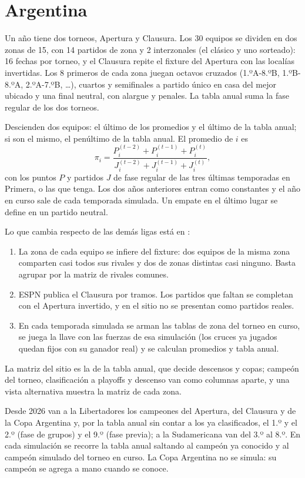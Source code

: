 \section{Argentina}
\label{sec:argentina}

 Un año tiene dos torneos, Apertura y Clausura. Los 30 equipos se dividen en dos zonas de 15, con 14 partidos de zona y 2 interzonales (el clásico y uno sorteado): 16 fechas por torneo, y el Clausura repite el fixture del Apertura con las localías invertidas. Los 8 primeros de cada zona juegan octavos cruzados (1.ºA-8.ºB, 1.ºB-8.ºA, 2.ºA-7.ºB, \dots), cuartos y semifinales a partido único en casa del mejor ubicado y una final neutral, con alargue y penales. La tabla anual suma la fase regular de los dos torneos.

 Descienden dos equipos: el último de los promedios y el último de la tabla anual; si son el mismo, el penúltimo de la tabla anual. El promedio de $i$ es
\[
\pi_i=\frac{P_i^{(t-2)}+P_i^{(t-1)}+P_i^{(t)}}{J_i^{(t-2)}+J_i^{(t-1)}+J_i^{(t)}},
\]
con los puntos $P$ y partidos $J$ de fase regular de las tres últimas temporadas en Primera, o las que tenga. Los dos años anteriores entran como constantes y el año en curso sale de cada temporada simulada. Un empate en el último lugar se define en un partido neutral.

 Lo que cambia respecto de las demás ligas está en :
\begin{enumerate}
\item La zona de cada equipo se infiere del fixture: dos equipos de la misma zona comparten casi todos sus rivales y dos de zonas distintas casi ninguno. Basta agrupar por la matriz de rivales comunes.
\item ESPN publica el Clausura por tramos. Los partidos que faltan se completan con el Apertura invertido, y en el sitio no se presentan como partidos reales.
\item En cada temporada simulada se arman las tablas de zona del torneo en curso, se juega la llave con las fuerzas de esa simulación (los cruces ya jugados quedan fijos con su ganador real) y se calculan promedios y tabla anual.
\end{enumerate}
La matriz del sitio es la de la tabla anual, que decide descensos y copas; campeón del torneo, clasificación a playoffs y descenso van como columnas aparte, y una vista alternativa muestra la matriz de cada zona.

 Desde 2026 van a la Libertadores los campeones del Apertura, del Clausura y de la Copa Argentina y, por la tabla anual sin contar a los ya clasificados, el 1.º y el 2.º (fase de grupos) y el 9.º (fase previa); a la Sudamericana van del 3.º al 8.º. En cada simulación se recorre la tabla anual saltando al campeón ya conocido y al campeón simulado del torneo en curso. La Copa Argentina no se simula: su campeón se agrega a mano cuando se conoce.

